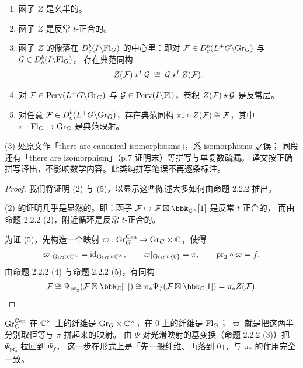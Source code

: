 \begin{theorem}\label{thm:Z}
\begin{enumerate}[label=(\arabic*),leftmargin=2.2em,itemsep=1pt]
\item 函子 $Z$ 是幺半的。
\item 函子 $Z$ 是反常 $t$-正合的。
\item 函子 $Z$ 的像落在 $D^b_c(I\backslash\mathrm{Fl}_G)$ 的中心里：即对
      $\mathcal{F}\in D^b_c(L^+G\backslash\mathrm{Gr}_G)$ 与 $\mathcal{G}\in D^b_c(I\backslash\mathrm{Fl}_G)$，
      存在典范同构
      \[
      Z(\mathcal{F})\star^{I}\mathcal{G}\;\cong\;\mathcal{G}\star^{I}Z(\mathcal{F}).
      \]
\item 对 $\mathcal{F}\in\mathrm{Perv}(L^+G\backslash\mathrm{Gr}_G)$ 与 $\mathcal{G}\in\mathrm{Perv}(I\backslash\mathrm{Fl})$，卷积 $Z(\mathcal{F})\star\mathcal{G}$ 是反常层。
\item 对任意 $\mathcal{F}\in D^b_c(L^+G\backslash\mathrm{Gr}_G)$，存在典范同构
      $\pi_*\circ Z(\mathcal{F})\cong\mathcal{F}$，其中 $\pi:\mathrm{Fl}_G\to\mathrm{Gr}_G$ 是典范映射。
\end{enumerate}
\end{theorem}

\begin{yizhu}
(3) 处原文作「there are canonical isomorphsisms」，系 isomorphisms 之误；
同段还有「there are isomorphism」（p.7 证明末）等拼写与单复数疏漏。
译文按正确拼写译出，不影响数学内容。此类纯拼写笔误不再逐条标注。
\end{yizhu}

\begin{proof}
我们将证明 (2) 与 (5)，以显示这些陈述大多如何由命题 2.2.2 推出。

(2) 的证明几乎是显然的。即：函子 $\cF\mapsto\cF\boxtimes\bbk_{\bbC^{\times}}[1]$ 是反常 $t$-正合的，
而由命题 2.2.2 (2)，附近循环是反常 $t$-正合的。

为证 (5)，先构造一个映射 $\varpi:\mathrm{Gr}_G^{\mathrm{Cen}}\to\mathrm{Gr}_G\times\mathbb{C}$，使得
\[
\varpi|_{\mathrm{Gr}_G\times\mathbb{C}^{\times}}=\mathrm{id}_{\mathrm{Gr}_G\times\mathbb{C}^{\times}},
\qquad
\varpi|_{\mathrm{Gr}_G\times\{0\}}=\pi,
\qquad
\mathrm{pr}_2\circ\varpi=f .
\]
由命题 2.2.2 (4) 与命题 2.2.2 (5)，有同构
\[
\cF\cong\Psi_{\mathrm{pr}_2}(\cF\boxtimes\bbk_{\bbC}[1])
\cong\pi_*\Psi_f(\cF\boxtimes\bbk_{\bbC}[1])=\pi_*Z(\cF).
\]
\end{proof}

\begin{yizhu}
$\mathrm{Gr}_G^{\mathrm{Cen}}$ 在 $\mathbb{C}^{\times}$ 上的纤维是 $\mathrm{Gr}_G\times\mathbb{C}^{\times}$，在 $0$ 上的纤维是 $\mathrm{Fl}_G$；
$\varpi$ 就是把这两半分别取恒等与 $\pi$ 拼起来的映射。
由 $\Psi$ 对光滑映射的基变换（命题 2.2.2 (3)）把 $\Psi_{\mathrm{pr}_2}$ 拉回到 $\Psi_f$，
这一步在形式上是「先一般纤维、再落到 $0$」，与 $\pi_*$ 的作用完全一致。
\end{yizhu}

